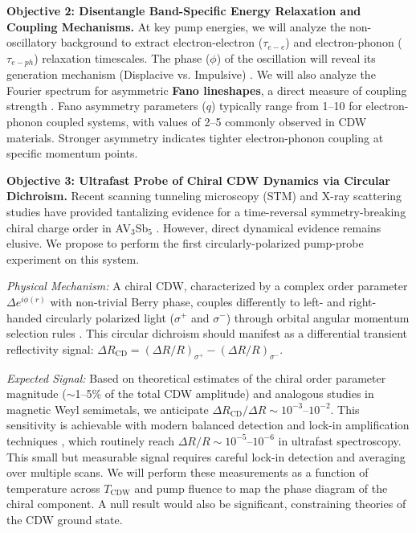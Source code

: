 \documentclass[12pt,a4paper]{article}
\begin{document}
\textbf{Objective 2: Disentangle Band-Specific Energy Relaxation and Coupling Mechanisms.} At key pump energies, we will analyze the non-oscillatory background to extract electron-electron ($\tau_{e-e}$) and electron-phonon ($\tau_{e-ph}$) relaxation timescales. The phase ($\phi$) of the oscillation will reveal its generation mechanism (Displacive vs. Impulsive) \cite{Zeiger1992}. We will also analyze the Fourier spectrum for asymmetric \textbf{Fano lineshapes}, a direct measure of coupling strength \cite{Klein1983}. Fano asymmetry parameters ($q$) typically range from 1--10 for electron-phonon coupled systems, with values of 2--5 commonly observed in CDW materials. Stronger asymmetry indicates tighter electron-phonon coupling at specific momentum points.

\textbf{Objective 3: Ultrafast Probe of Chiral CDW Dynamics via Circular Dichroism.} Recent scanning tunneling microscopy (STM) and X-ray scattering studies have provided tantalizing evidence for a time-reversal symmetry-breaking chiral charge order in AV$_3$Sb$_5$ \cite{Jiang2021, Shrestha2023}. However, direct dynamical evidence remains elusive. We propose to perform the first circularly-polarized pump-probe experiment on this system.

\textit{Physical Mechanism:} A chiral CDW, characterized by a complex order parameter $\Delta e^{i\phi(r)}$ with non-trivial Berry phase, couples differently to left- and right-handed circularly polarized light ($\sigma^+$ and $\sigma^-$) through orbital angular momentum selection rules \cite{Wang2020}. This circular dichroism should manifest as a differential transient reflectivity signal: $\Delta R_{\text{CD}} = (\Delta R/R)_{\sigma^+} - (\Delta R/R)_{\sigma^-}$.

\textit{Expected Signal:} Based on theoretical estimates of the chiral order parameter magnitude ($\sim$1--5\% of the total CDW amplitude) and analogous studies in magnetic Weyl semimetals, we anticipate $\Delta R_{\text{CD}} / \Delta R \sim 10^{-3}$--$10^{-2}$. This sensitivity is achievable with modern balanced detection and lock-in amplification techniques \cite{Giannetti2016}, which routinely reach $\Delta R/R \sim 10^{-5}$--$10^{-6}$ in ultrafast spectroscopy. This small but measurable signal requires careful lock-in detection and averaging over multiple scans. We will perform these measurements as a function of temperature across $T_{\text{CDW}}$ and pump fluence to map the phase diagram of the chiral component. A null result would also be significant, constraining theories of the CDW ground state.
\end{document}
